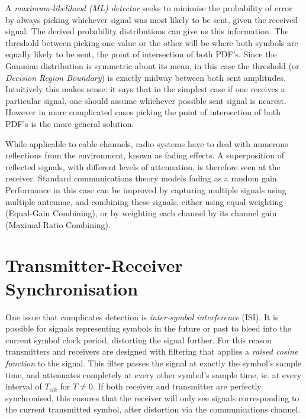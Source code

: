 A \emph{maximum-likelihood (ML) detector} seeks to minimise the probability of
error by always picking whichever signal was most likely to be sent, given
the received signal. The derived probability distributions can give us this information. The threshold between picking one value or the other
will be where both symbols are equally likely to be sent, the point of
intersection of both PDF's. Since the Gaussian distribution is symmetric
about its mean, in this case the threshold (or \emph{Decision Region
Boundary}) is exactly midway between both sent amplitudes. Intuitively
this makes sense: it says that in the simplest case if one receives a particular
signal, one should assume whichever possible sent signal is nearest. However in more complicated cases picking the point of intersection of both PDF's
is the more general solution. 

While applicable to cable channels, radio systems have to deal with numerous reflections from the environment, known as fading effects. A superposition of reflected signals, with different levels of attenuation, is therefore seen at the receiver. Standard communications theory models fading as a random gain. Performance in this case can be improved by capturing multiple signals using multiple antennae, and combining these signals, either using equal weighting (Equal-Gain Combining), or by weighting each channel by its channel gain (Maximal-Ratio Combining).

\section{Transmitter-Receiver Synchronisation}

One issue that complicates detection is \emph{inter-symbol
interference} (ISI). It is possible for signals representing symbols in
the future or past to bleed into the current symbol clock period,
distorting the signal further. For this reason transmitters and receivers
are designed with filtering that applies a \emph{raised cosine function} to the signal.
This filter passes the signal at exactly the symbol's sample time, and attenuates
completely at every other symbol's sample time, ie. at every interval of
$T_{clk}$ for $T \neq 0$. If both receiver and transmitter are perfectly
synchronised, this ensures that the receiver will only see signals
corresponding to the current transmitted symbol, after distortion via
the communications channel.

